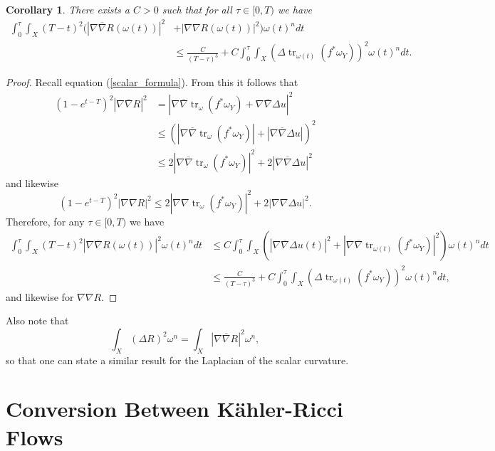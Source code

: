 \documentclass[12pt]{article}
\newtheorem{corollary}[theorem]{Corollary}
\numberwithin{equation}{section}
\DeclareMathOperator{\tr}{tr}
\newcommand{\oo}[1]{\overline{#1}}
\begin{document}
\begin{corollary}
There exists a $C > 0$ such that for all $\tau \in [0,T)$ we have
\begin{align*}
    \int_0^\tau \int_X (T-t)^2(|\nabla \oo{\nabla} R(\omega(t))|^2 &+ |\nabla \nabla R(\omega(t))|^2) \omega(t)^n dt\\
    &\leq \frac{C}{(T-\tau)^3} + C \int_0^\tau \int_X (\Delta \tr_{\omega(t)}(f^*\omega_Y))^2 \omega(t)^n dt.
\end{align*}
\end{corollary}

\begin{proof}
Recall equation (\ref{scalar_formula}). From this it follows that
\begin{align*}
    (1-e^{t-T})^2 |\nabla \oo{\nabla} R|^2 &= |\nabla \oo{\nabla} \tr_\omega(f^*\omega_Y) + \nabla \oo{\nabla} \Delta u|^2\\
    &\leq (|\nabla \oo{\nabla} \tr_\omega(f^*\omega_Y)| + |\nabla \oo{\nabla} \Delta u|)^2\\
    &\leq 2|\nabla \oo{\nabla} \tr_\omega(f^*\omega_Y)|^2 + 2|\nabla \oo{\nabla} \Delta u|^2
\end{align*}
and likewise
\begin{equation*}
    (1-e^{t-T})^2|\nabla \nabla R|^2 \leq 2|\nabla \nabla \tr_\omega(f^*\omega_Y)|^2 + 2 |\nabla \nabla \Delta u|^2.
\end{equation*}
Therefore, for any $\tau \in [0,T)$ we have
\begin{align*}
    \int_0^\tau \int_X (T-t)^2 |\nabla \oo{\nabla} R(\omega(t))|^2\omega(t)^n dt &\leq C\int_0^\tau \int_X (|\nabla \oo{\nabla} \Delta u(t)|^2 + |\nabla \oo{\nabla} \tr_{\omega(t)}(f^*\omega_Y)|^2) \omega(t)^n dt\\
    &\leq \frac{C}{(T-\tau)^3} + C\int_0^\tau \int_X (\Delta \tr_{\omega(t)}(f^*\omega_Y))^2 \omega(t)^n dt,
\end{align*}
and likewise for $\nabla \nabla R$.
\end{proof}

\noindent Also note that
\begin{equation*}
    \int_X (\Delta R)^2 \omega^n = \int_X |\nabla \oo{\nabla} R|^2 \omega^n,
\end{equation*}
so that one can state a similar result for the Laplacian of the scalar curvature. 

\section{Conversion Between K\"ahler-Ricci Flows}
\end{document}
